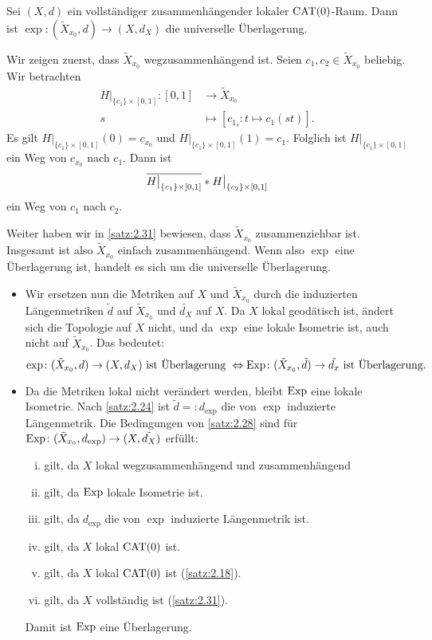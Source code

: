 \begin{satz}
\label{satz:2.33}
	Sei $(X,d)$ ein vollständiger zusammenhängender lokaler $\operatorname{CAT(0)}$-Raum. 
	Dann ist $\exp\colon (\tilde{X}_{x_0},d) \rightarrow (X,d_X)$ die universelle Überlagerung.
\end{satz}

\begin{beweis}
	Wir zeigen zuerst, dass $\tilde{X}_{x_0}$ wegzusammenhängend ist.
	Seien $c_1,c_2 \in \tilde{X}_{x_0}$ beliebig.
	Wir betrachten
	\begin{align*}
		H \big|_{\{c_1\} \times [0,1]} \colon [0,1] &\longrightarrow \tilde{X}_{x_0} \\
		s &\longmapsto [c_{1_s} \colon t \mapsto c_1(st)].
	\end{align*}
	Es gilt $H \big|_{\{c_1\} \times [0,1]}(0) = c_{x_0}$ und $H \big|_{\{c_1\} \times [0,1]}(1) = c_1$.
	Folglich ist $H\big|_{\{c_1\} \times [0,1]}$ ein Weg von $c_{x_0}$ nach $c_1$.
	Dann ist
	\[
		\overline{H \big|_{\{c_1\} \times [0,1]}} * H \big|_{\{c_2\} \times [0,1]}
	\] 
	ein Weg von $c_1$ nach $c_2$.
	
	Weiter haben wir in \autoref{satz:2.31} bewiesen, dass $\tilde{X}_{x_0}$ zusammenziehbar ist.
	Insgesamt ist also $\tilde{X}_{x_0}$ einfach zusammenhängend.
	Wenn also $\exp$ eine Überlagerung ist, handelt es sich um die universelle Überlagerung.
	\begin{itemize}
		\item Wir ersetzen nun die Metriken auf $X$ und $\tilde{X}_{x_0}$ durch die induzierten Längenmetriken $\tilde{d}$ auf $\tilde{X}_{x_0}$ und $\tilde{d_X}$ auf $X$.
		Da $X$ lokal geodätisch ist, ändert sich die Topologie auf $X$ nicht, und da $\exp$ eine lokale Isometrie ist, auch nicht auf $\tilde{X}_{x_0}$.
		Das bedeutet:
		\[
			\exp\colon (\tilde{X}_{x_0},d) \rightarrow (X,d_X) \text{ ist Überlagerung } \Leftrightarrow \operatorname{Exp}\colon (\tilde{X}_{x_0},\tilde{d}) \rightarrow \tilde{d_x} \text{ ist Überlagerung.}
		\]
		\item Da die Metriken lokal nicht verändert werden, bleibt $\operatorname{Exp}$ eine lokale Isometrie.
		Nach \autoref{satz:2.24} ist $\tilde{d} =: d_{\exp}$ die von $\exp$ induzierte Längenmetrik.
		Die Bedingungen von \autoref{satz:2.28} sind für $\operatorname{Exp}\colon (\tilde{X}_{x_0},d_{\exp}) \rightarrow (X,\tilde{d_X})$ erfüllt:
		\begin{enumerate}[(i)]
			\item gilt, da $X$ lokal wegzusammenhängend und zusammenhängend
			\item gilt, da $\operatorname{Exp}$ lokale Isometrie ist.
			\item gilt, da $d_{\exp}$ die von $\exp$ induzierte Längenmetrik ist.
			\item gilt, da $X$ lokal $\operatorname{CAT(0)}$ ist.
			\item gilt, da $X$ lokal $\operatorname{CAT(0)}$ ist (\autoref{satz:2.18}).
			\item gilt, da $X$ vollständig ist (\autoref{satz:2.31}).
		\end{enumerate}
		Damit ist $\operatorname{Exp}$ eine Überlagerung. \qedhere
	\end{itemize}
\end{beweis}

